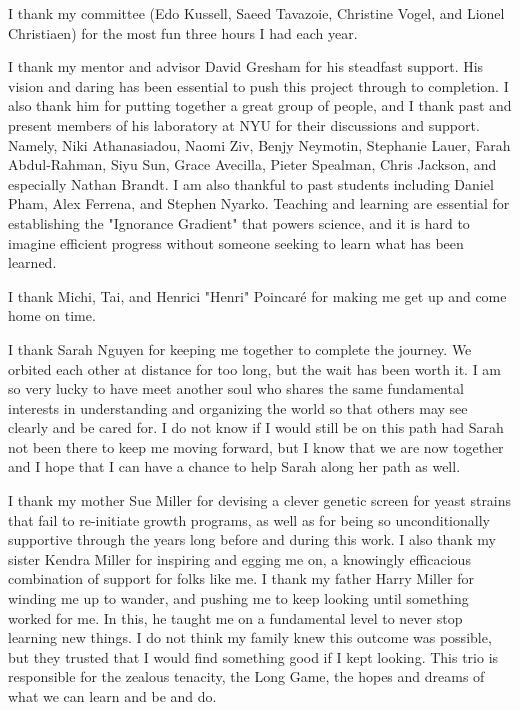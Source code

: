 \documentclass[12pt,letterpaper]{memoir}
\begin{document}
I thank my committee (Edo Kussell, Saeed Tavazoie, Christine Vogel,
and Lionel Christiaen) for the most fun three hours I had each year.

I thank my mentor and advisor David Gresham for his steadfast
support. His vision and daring has been essential to push this 
project through to completion. I also thank him for putting together
a great group of people, and I thank past and present members of 
his laboratory at NYU for their discussions and support.
Namely, Niki Athanasiadou, Naomi Ziv, 
Benjy Neymotin, Stephanie Lauer, Farah Abdul-Rahman, Siyu Sun,
Grace Avecilla, Pieter Spealman, Chris Jackson,
and especially Nathan Brandt.
I am also thankful to past students including Daniel Pham, 
Alex Ferrena, and Stephen Nyarko. Teaching and learning are essential
for establishing the "Ignorance Gradient" that powers science, and it
is hard to imagine efficient progress without 
someone seeking to learn what has been learned.


I thank Michi, Tai, and Henrici "Henri" Poincar\'{e} 
for making me get up and come home on time.

I thank Sarah Nguyen for keeping me together to complete the journey.
We orbited each other at distance for too long, 
but the wait has been worth it.
I am so very lucky to have meet another soul who shares the same
fundamental interests in understanding and organizing the world so
that others may see clearly and be cared for. I do not know if I
would still be on this path had Sarah not been there to keep me
moving forward, but I know that we are now together and I hope that
I can have a chance to help Sarah along her path as well.

I thank my mother Sue Miller for devising a clever genetic screen 
for yeast strains that fail to re-initiate growth programs, 
as well as for being so unconditionally supportive through the years 
long before and during this work.
I also thank my sister Kendra Miller for inspiring and egging me on, 
a knowingly efficacious combination of support for folks like me.
I thank my father Harry Miller for winding me up to wander, 
and pushing me to keep looking until something worked for me. 
In this, he taught me on a fundamental level
to never stop learning new things. 
I do not think my family knew this outcome was possible, 
but they trusted that I would find something good if I kept looking. 
This trio is responsible for the zealous tenacity, the Long Game, 
the hopes and dreams of what we can learn
and be and do. 
\end{document}
